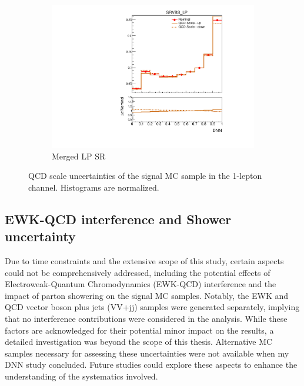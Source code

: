 \begin{figure}[ht]
\begin{subfigure}[b]{0.3\textwidth}
        \includegraphics[width=\textwidth]{figures/1lep/PDFUnc/QCDScale_DNN/EW6lvqq_0ptag1pfat0pjet_0ptv_SRVBS_LP_DNN_SysTheoryQCD_VBS__1up_Norm.pdf}
        \caption{Merged LP SR}
    \end{subfigure}
    \caption{QCD scale uncertainties of the signal MC sample in the 1-lepton channel. Histograms are normalized.}
    \label{fig:ScaleUnc1Lep_sig}
\end{figure}

\clearpage
\subsection{EWK-QCD interference and Shower uncertainty}
\label{subsec:sig_uncer_interf}

Due to time constraints and the extensive scope of this study, certain aspects could not be comprehensively addressed, including the potential effects of Electroweak-Quantum Chromodynamics (EWK-QCD) interference and the impact of parton showering on the signal MC samples. 
Notably, the EWK and QCD vector boson plus jets (VV+jj) samples were generated separately, implying that no interference contributions were considered in the analysis. While these factors are acknowledged for their potential minor impact on the results, a detailed investigation was beyond the scope of this thesis. Alternative MC samples necessary for assessing these uncertainties were not available when my DNN study concluded. Future studies could explore these aspects to enhance the understanding of the systematics involved.

